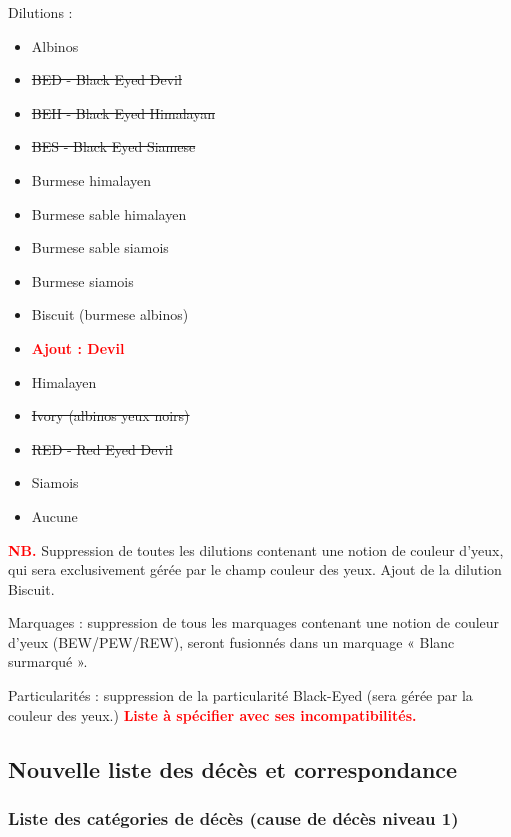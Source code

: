 \documentclass[a4paper,10pt]{article}
\newcommand\desire[1]{\noindent\textbf{\textcolor{red}{#1}}}
\begin{document}
Dilutions : 
\begin{itemize}
\item Albinos
\item \sout{BED - Black Eyed Devil}
\item \sout{BEH - Black Eyed Himalayan}
\item \sout{BES - Black Eyed Siamese}
\item Burmese himalayen
\item Burmese sable himalayen
\item Burmese sable siamois
\item Burmese siamois
\item Biscuit (burmese albinos)
\item \desire{Ajout : Devil}
\item Himalayen
\item \sout{Ivory (albinos yeux noirs)}
\item \sout{RED - Red Eyed Devil}
\item Siamois
\item Aucune
\end{itemize}

\desire{NB.} Suppression de toutes les dilutions contenant une notion de couleur d’yeux, qui sera exclusivement gérée par le champ couleur des yeux. Ajout de la dilution Biscuit.

Marquages : suppression de tous les marquages contenant une notion de couleur d’yeux (BEW/PEW/REW), seront fusionnés dans un marquage « Blanc surmarqué ». 

Particularités : suppression de la particularité Black-Eyed (sera gérée par la couleur des yeux.) \desire{Liste à spécifier avec ses incompatibilités.}

\subsection{Nouvelle liste des décès et correspondance}
\subsubsection{Liste des catégories de décès (cause de décès niveau 1)}
\end{document}
